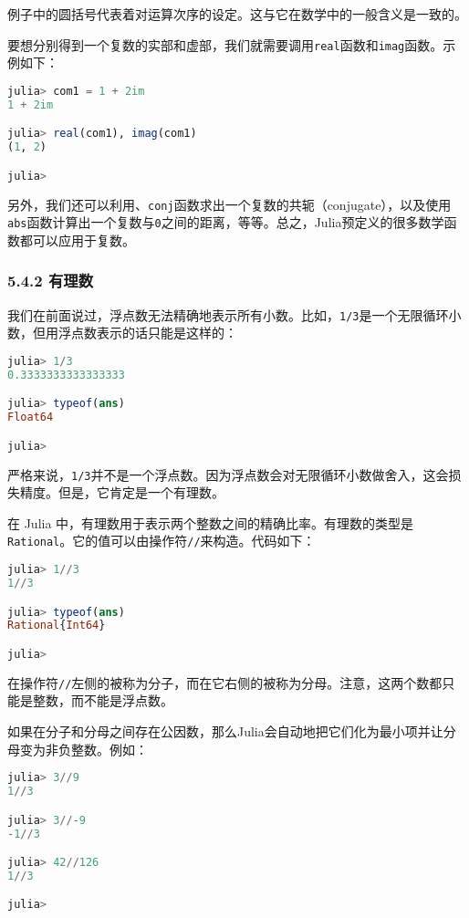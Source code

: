 例子中的圆括号代表着对运算次序的设定。这与它在数学中的一般含义是一致的。

要想分别得到一个复数的实部和虚部，我们就需要调用\verb`real`函数和\verb`imag`函数。示例如下：
\begin{lstlisting}[language=julia]
julia> com1 = 1 + 2im 
1 + 2im

julia> real(com1), imag(com1)
(1, 2)

julia> 
\end{lstlisting}

另外，我们还可以利用、\verb`conj`函数求出一个复数的共轭（conjugate），以及使用\verb`abs`函数计算出一个复数与\verb`0`之间的距离，等等。总之，Julia预定义的很多数学函数都可以应用于复数。

\subsubsection{5.4.2 有理数}

我们在前面说过，浮点数无法精确地表示所有小数。比如，\verb`1/3`是一个无限循环小数，但用浮点数表示的话只能是这样的：
\begin{lstlisting}[language=julia]
julia> 1/3
0.3333333333333333

julia> typeof(ans)
Float64

julia> 
\end{lstlisting}

严格来说，\verb`1/3`并不是一个浮点数。因为浮点数会对无限循环小数做舍入，这会损失精度。但是，它肯定是一个有理数。

在 Julia 中，有理数用于表示两个整数之间的精确比率。有理数的类型是\verb`Rational`。它的值可以由操作符\verb`//`来构造。代码如下：
\begin{lstlisting}[language=julia]
julia> 1//3
1//3

julia> typeof(ans)
Rational{Int64}

julia> 
\end{lstlisting}

在操作符\verb`//`左侧的被称为分子，而在它右侧的被称为分母。注意，这两个数都只能是整数，而不能是浮点数。

如果在分子和分母之间存在公因数，那么Julia会自动地把它们化为最小项并让分母变为非负整数。例如：
\begin{lstlisting}[language=julia]
julia> 3//9
1//3

julia> 3//-9
-1//3

julia> 42//126
1//3

julia> 
\end{lstlisting}

